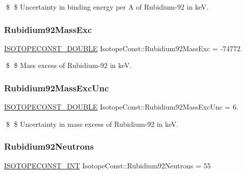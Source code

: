 \$ \$ Uncertainty in binding energy per A of Rubidium-\/92 in keV. \mbox{\label{group___isotope_const-_rubidium-_rb92_ga0bec041634e197a736355fe0b99a8ef5}} 
\subsubsection{\texorpdfstring{Rubidium92\+Mass\+Exc}{Rubidium92MassExc}}
{\footnotesize\ttfamily \mbox{\hyperlink{group___isotope_const-_macros_ga8f45a7272ce02c0b4c65c44636ed719a}{I\+S\+O\+T\+O\+P\+E\+C\+O\+N\+S\+T\+\_\+\+D\+O\+U\+B\+LE}} Isotope\+Const\+::\+Rubidium92\+Mass\+Exc = -\/74772.}

\$ \$ Mass excess of Rubidium-\/92 in keV. \mbox{\label{group___isotope_const-_rubidium-_rb92_ga81946dd254c04b298142f25edcc5d17f}} 
\subsubsection{\texorpdfstring{Rubidium92\+Mass\+Exc\+Unc}{Rubidium92MassExcUnc}}
{\footnotesize\ttfamily \mbox{\hyperlink{group___isotope_const-_macros_ga8f45a7272ce02c0b4c65c44636ed719a}{I\+S\+O\+T\+O\+P\+E\+C\+O\+N\+S\+T\+\_\+\+D\+O\+U\+B\+LE}} Isotope\+Const\+::\+Rubidium92\+Mass\+Exc\+Unc = 6.}

\$ \$ Uncertainty in mass excess of Rubidium-\/92 in keV. \mbox{\label{group___isotope_const-_rubidium-_rb92_gaff25ebfb165fc05c3a2e2f999e563160}} 
\subsubsection{\texorpdfstring{Rubidium92\+Neutrons}{Rubidium92Neutrons}}
{\footnotesize\ttfamily \mbox{\hyperlink{group___isotope_const-_macros_ga5f18360b3e99483a35c32d789e62621c}{I\+S\+O\+T\+O\+P\+E\+C\+O\+N\+S\+T\+\_\+\+I\+NT}} Isotope\+Const\+::\+Rubidium92\+Neutrons = 55}

